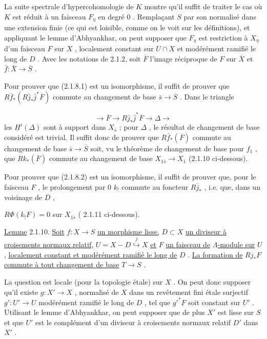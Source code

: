La suite spectrale d'hypercohomologie de $K$ montre qu'il suffit de traiter le cas où $K$ est réduit à un faisceau $F_\eta$ en degré $0$ . Remplaçant $S$ par son normalisé dans une extension finie (ce qui est loisible, comme on le voit sur les définitions), et appliquant le lemme d'Abhyankhar, on peut supposer que $F_\eta$ est restriction à $X_\eta$ d'un faisceau $F$ sur $X$ , localement constant sur $U \cap X$ et modérément ramifié le long de $D$ . Avec les notations de 2.1.2, soit $\overline{F}$ l'image réciproque de $F$ sur $\overline{X}$ et $\bar f : \overline{X} \to \overline{S}$ .

Pour prouver que (2.1.8.1) est un isomorphisme, il suffit de prouver que $R\bar f_* (R\bar j_* \bar j^* \overline{F})$ commute au changement de base $\bar s \to \overline{S}$ . Dans le triangle

\begin{equation*}
\longrightarrow \overline{F} \longrightarrow R\bar j_* \bar j^* \overline{F} \longrightarrow \Delta \longrightarrow
\end{equation*}
les $\underline{H}^i(\Delta)$ sont à support dans $X_{\bar s}$ ; pour $\Delta$ , le résultat de changement de base considéré est trivial. Il suffit donc de prouver que $R\bar f_*(\overline{F})$ commute au changement de base $\bar s \to \overline{S}$ soit, vu le théorème de changement de base pour $f_1$ , que
$Rk_*(\overline{F})$ commute au changement de base $X_{1\bar s} \to X_1$ (2.1.10 ci-dessous).

Pour prouver que (2.1.8.2) est un isomorphisme, il suffit de prouver que, pour le faisceau $F$ , le prolongement par $0$ $k_!$ commute au foncteur $R\bar j_*$ , i.e. que, dans un voisinage de $D$ ,

$R\Phi(k_! F) = 0$ sur $X_{1\bar s}$ ( 2.1.11 ci-dessous).

\underline{Lemme} 2.1.10. \underline{Soit} $f : X \to S$ \underline{un morphisme lisse,} $D \subset X$ \underline{un diviseur à croisements normaux relatif,} $U = X - D \stackrel{j}{\hookrightarrow} X$ \underline{et} $F$ \underline{un faisceau de} $\Lambda$\underline{-module sur} $U$ , \underline{localement constant et modérément ramifié le long de} $D$ . \underline{La formation de} $Rj_* F$ \underline{commute à tout changement de base} $T \to S$ .

La question est locale (pour la topologie étale) sur $X$ . On peut donc supposer qu'il existe $g : X' \to X$ , normalisé de $X$ dans un revêtement fini étale surjectif $g' : U' \to U$ modérément ramifié le long de $D$ , tel que $g'^* F$ soit constant sur $U'$ . Utilisant le lemme d'Abhyankhar, on peut supposer que de plus $X'$ est lisse sur $S$ et que $U'$ est le complément d'un diviseur à croisements normaux relatif $D'$ dans $X'$ .

